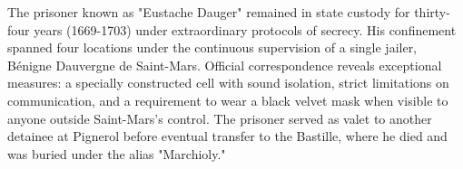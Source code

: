 The prisoner known as "Eustache Dauger" remained in state custody for thirty-four years (1669-1703) under extraordinary protocols of secrecy. His confinement spanned four locations under the continuous supervision of a single jailer, Bénigne Dauvergne de Saint-Mars. Official correspondence reveals exceptional measures: a specially constructed cell with sound isolation, strict limitations on communication, and a requirement to wear a black velvet mask when visible to anyone outside Saint-Mars's control. The prisoner served as valet to another detainee at Pignerol before eventual transfer to the Bastille, where he died and was buried under the alias "Marchioly."